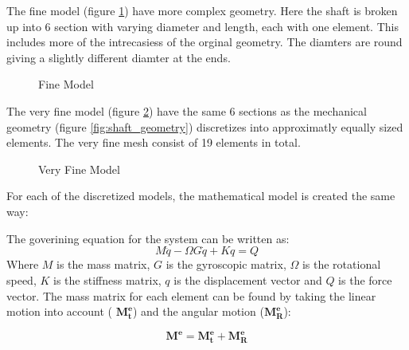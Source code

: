 The fine model (figure \ref{fig:fine_model}) have more complex geometry. Here the shaft is broken up into 6 section with varying diameter and length, each with one element. This includes more of the intrecasiess of the orginal geometry. The diamters are round giving a slightly different diamter at the ends.
\begin{figure}[ht]
    \centering
    
    \caption{Fine Model}
    \label{fig:fine_model}
\end{figure}

The very fine model (figure \ref{fig:very_fine_model}) have the same 6 sections as the mechanical geometry (figure \ref{fig:shaft_geometry}) discretizes into approximatly equally sized elements. The very fine mesh consist of 19 elements in total.
\begin{figure}[ht]
    \centering
    
    \caption{Very Fine Model}
    \label{fig:very_fine_model}
\end{figure}

For each of the discretized models, the mathematical model is created the same way:

The goverining equation for the system can be written as:
\begin{equation}
    M \ddot{q} - \Omega G \dot{q} + K q = Q
\end{equation}
Where $M$ is the mass matrix, $G$ is the gyroscopic matrix, $\Omega$ is the rotational speed, $K$ is the stiffness matrix, $q$ is the displacement vector and $Q$ is the force vector. The mass matrix for each element can be found by taking the linear motion into account ( $\mathbf{M_t^e}$) and the angular motion ($\mathbf{M_R^e}$):

\begin{equation}
    \mathbf{M^e} = \mathbf{M_t^e} + \mathbf{M_R^e} 
\end{equation}

